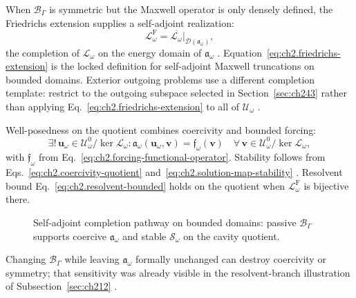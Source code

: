 When \(\mathcal{B}_\Gamma\) is symmetric but the Maxwell operator is only densely defined, the Friedrichs extension supplies a self-adjoint realization:
\begin{equation}
\label{eq:ch2.friedrichs-extension}
\mathcal{L}_\omega^{\mathrm{F}}
=
\overline{\mathcal{L}_\omega}\big|_{\mathcal{D}(\mathfrak{a}_\omega)},
\end{equation}
the completion of \(\mathcal{L}_\omega\) on the energy domain of \(\mathfrak{a}_\omega\) \cite{stratton1941}. Equation~\eqref{eq:ch2.friedrichs-extension} is the locked definition for self-adjoint Maxwell truncations on bounded domains. Exterior outgoing problems use a different completion template: restrict to the outgoing subspace selected in Section~\ref{sec:ch243} rather than applying Eq.~\eqref{eq:ch2.friedrichs-extension} to all of \(\mathcal{U}_\omega\) \cite{harrington2001}.

Well-posedness on the quotient combines coercivity and bounded forcing:
\begin{equation}
\label{eq:ch2.lax-milgram-wellposed}
\exists!\,\mathbf{u}_\omega\in\mathcal{U}_\omega^{0}/\ker\mathcal{L}_\omega:
\mathfrak{a}_\omega(\mathbf{u}_\omega,\mathbf{v})
=
\mathfrak{f}_\omega(\mathbf{v})
\quad\forall\,\mathbf{v}\in\mathcal{U}_\omega^{0}/\ker\mathcal{L}_\omega,
\end{equation}
with \(\mathfrak{f}_\omega\) from Eq.~\eqref{eq:ch2.forcing-functional-operator}. Stability follows from Eqs.~\eqref{eq:ch2.coercivity-quotient} and~\eqref{eq:ch2.solution-map-stability} \cite{stratton1941}. Resolvent bound Eq.~\eqref{eq:ch2.resolvent-bounded} holds on the quotient when \(\mathcal{L}_\omega^{\mathrm{F}}\) is bijective there.
\begin{figure}[t]
\centering
{}
\caption{Self-adjoint completion pathway on bounded domains: passive \(\mathcal{B}_\Gamma\) supports coercive \(\mathfrak{a}_\omega\) and stable \(\mathcal{S}_\omega\) on the cavity quotient.}
\label{fig:ch2.self-adjoint-closure-pathway}
\end{figure}
Changing \(\mathcal{B}_\Gamma\) while leaving \(\mathfrak{a}_\omega\) formally unchanged can destroy coercivity or symmetry; that sensitivity was already visible in the resolvent-branch illustration of Subsection~\ref{sec:ch212} \cite{stratton1941}.

